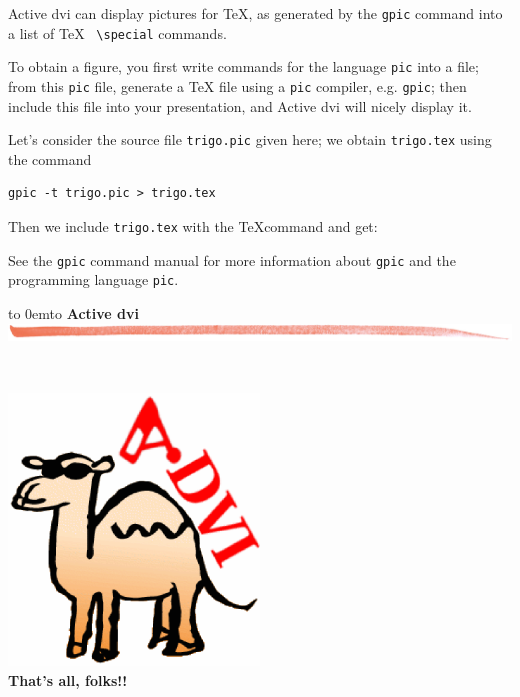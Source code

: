 \documentclass[12pt]{article}
\def\keymenu#1{\textcolor{red}{\underline{#1}}}
\def\advifooter{\vbox to 0em{\vbox to \vsize {\vfill
Press: \keymenu{n}ext page \keymenu{p}revious page
\keymenu{\textvisiblespace} next pause} \vss}}
\def\adviheader{\noindent
{\bf\Large Active dvi}\\
\includegraphics[width=\textwidth]{../tex/bar.jpg.eps}}
\let \Newpage \newpage
\def \newpage {\Newpage \advifooter\adviheader}
\def\adviemptyfooter{\vbox to 0em{\vbox to \vsize {\vfill
~~} \vss}}
\def\lastpage{\Newpage\adviemptyfooter\adviheader}
\begin{document}
Active dvi can display pictures for \TeX, as generated by
the \verb"gpic" command into a list of \TeX~ \verb"\special" commands.

\bigskip

To obtain a figure, you first write commands for the language
\verb"pic" into a file; from this \verb"pic" file, generate a \TeX
file using a \verb"pic" compiler, e.g. \verb"gpic"; then include this
file into your presentation, and Active dvi will nicely display it.

Let's consider the source file \verb"trigo.pic" given here; we obtain
\verb"trigo.tex" using the command 
\begin{verbatim}
gpic -t trigo.pic > trigo.tex
\end{verbatim}

Then we include \verb"trigo.tex" with the \TeX command
\verb|| and get:

\def\showgraph{%
  \par\medskip\centerline{\raise 1em\box\graph}\bigskip\noindent\ignorespaces}



See the \verb"gpic" command manual for more information about
\verb"gpic" and the programming language \verb"pic".

\lastpage

~\vfill
\begin{center}
\includegraphics[width=0.5\textwidth]{../tex/advilogo.eps}\\
{\Large \bf That's all, folks!!}
\end{center}
\vfill
\end{document}
